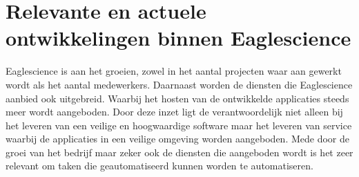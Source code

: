 \section{Relevante en actuele ontwikkelingen binnen Eaglescience}
Eaglescience is aan het groeien, zowel in het aantal projecten waar aan gewerkt wordt als het aantal medewerkers. Daarnaast worden de diensten die Eaglescience aanbied ook uitgebreid. Waarbij het hosten van de ontwikkelde applicaties steeds meer wordt aangeboden. Door deze inzet ligt de verantwoordelijk niet alleen bij het leveren van een veilige en hoogwaardige software maar het leveren van service waarbij de applicaties in een veilige omgeving worden aangeboden. Mede door de groei van het bedrijf maar zeker ook de diensten die aangeboden wordt is het zeer relevant om taken die geautomatiseerd kunnen worden te automatiseren.
